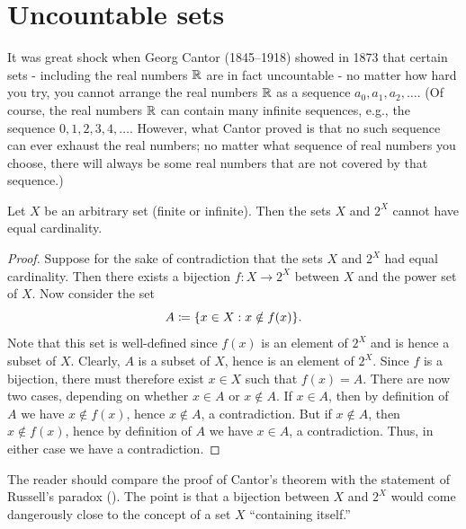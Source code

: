 \section{Uncountable sets}\label{i:sec:8.3}

\begin{note}
  It was great shock when Georg Cantor (1845--1918) showed in 1873 that certain sets
  - including the real numbers \(\mathbb{R}\) are in fact uncountable -
  no matter how hard you try, you cannot arrange the real numbers \(\mathbb{R}\) as a sequence \(a_0, a_1, a_2, \dots\).
  (Of course, the real numbers \(\mathbb{R}\) can contain many infinite sequences, e.g., the sequence \(0, 1, 2, 3, 4, \dots\).
  However, what Cantor proved is that no such sequence can ever exhaust the real numbers;
  no matter what sequence of real numbers you choose, there will always be some real numbers that are not covered by that sequence.)
\end{note}

\begin{thm}\label{i:8.3.1}
  Let \(X\) be an arbitrary set (finite or infinite).
  Then the sets \(X\) and \(2^X\) cannot have equal cardinality.
\end{thm}

\begin{proof}
  Suppose for the sake of contradiction that the sets \(X\) and \(2^X\) had equal cardinality.
  Then there exists a bijection \(f : X \to 2^X\) between \(X\) and the power set of \(X\).
  Now consider the set
  \[
    A \coloneqq \set{x \in X : x \notin f(x)}.
  \]
  Note that this set is well-defined since \(f(x)\) is an element of \(2^X\) and is hence a subset of \(X\).
  Clearly, \(A\) is a subset of \(X\), hence is an element of \(2^X\).
  Since \(f\) is a bijection, there must therefore exist \(x \in X\) such that \(f(x) = A\).
  There are now two cases, depending on whether \(x \in A\) or \(x \notin A\).
  If \(x \in A\), then by definition of \(A\) we have \(x \notin f(x)\), hence \(x \notin A\), a contradiction.
  But if \(x \notin A\), then \(x \notin f(x)\), hence by definition of \(A\) we have \(x \in A\), a contradiction.
  Thus, in either case we have a contradiction.
\end{proof}

\begin{rmk}\label{i:8.3.2}
  The reader should compare the proof of Cantor's theorem with the statement of Russell's paradox ().
  The point is that a bijection between \(X\) and \(2^X\) would come dangerously close to the concept of a set \(X\) ``containing itself.''
\end{rmk}

